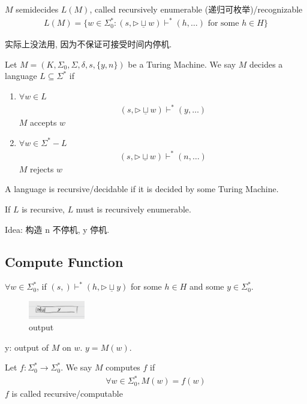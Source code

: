 \begin{definition}
    $M$ semidecides $L(M)$, called recursively enumerable (递归可枚举)/recognizable
    \begin{align*}
        L(M)=\{ w\in\Sigma_0^*: (s, \triangleright\underline{ \sqcup } w  ) \vdash^* (h,\dots) \text{ for some }h\in H\}
    \end{align*}
\end{definition}
实际上没法用, 因为不保证可接受时间内停机. 

\begin{definition}
    Let $M=(K,\Sigma_0, \Sigma, \delta, s, \{ y,n \})$ be a Turing Machine. We say $M$ decides a language $L\subseteq \Sigma^*$ if 
    \begin{enumerate}
        \item $\forall w\in L$
        \begin{align*}
            (s,  \triangleright\underline{ \sqcup } w)\vdash^*(y,\dots)
        \end{align*}
        $M$ accepts $w$
        \item $\forall w\in \Sigma^*-L$
        \begin{align*}
            (s,  \triangleright\underline{ \sqcup } w)\vdash^*(n,\dots)
        \end{align*}
        $M$ rejects $w$
    \end{enumerate} 

    A language is recursive/decidable if it is decided by some Turing Machine. 
\end{definition}

\begin{theorem}
    If $L$ is recursive, $L$ must is recursively enumerable. 
\end{theorem}
Idea: 构造 n 不停机, y 停机.

\subsection{Compute Function}
\begin{definition}
    $\forall w\in\Sigma_0^*$, if $(s, )\vdash^*(h, \triangleright \underline{\sqcup}y)$ for some $h\in H$ and some $y\in\Sigma^*_0$. 
    \begin{figure}[!htb]
        \centering
        \includegraphics[width=0.22\textwidth]{pic/TC5/output.png}
        \caption{output}
    \end{figure}
    
    y: output of $M$ on $w$. $y=M(w)$. 

    Let $f:\Sigma^*_0\to \Sigma^*_0$. We say $M$ computes $f$ if 
    \begin{align*}
        \forall w\in \Sigma^*_0, M(w)=f(w)
    \end{align*}
    $f$ is called recursive/computable
\end{definition}

